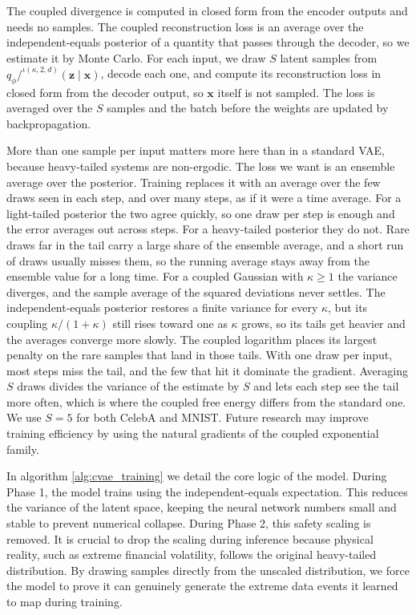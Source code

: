 \documentclass[twoside,11pt]{article}
\begin{document}
The coupled divergence is computed in closed form from the encoder outputs and needs no samples. The coupled reconstruction loss is an average over the independent-equals posterior of a quantity that passes through the decoder, so we estimate it by Monte Carlo. For each input, we draw $S$ latent samples from $q_\phi/^{\iota(\kappa,2,d)}(\mathbf{z}\mid\mathbf{x})$, decode each one, and compute its reconstruction loss in closed form from the decoder output, so $\mathbf{x}$ itself is not sampled. The loss is averaged over the $S$ samples and the batch before the weights are updated by backpropagation.

More than one sample per input matters more here than in a standard VAE, because heavy-tailed systems are non-ergodic. The loss we want is an ensemble average over the posterior. Training replaces it with an average over the few draws seen in each step, and over many steps, as if it were a time average. For a light-tailed posterior the two agree quickly, so one draw per step is enough and the error averages out across steps. For a heavy-tailed posterior they do not. Rare draws far in the tail carry a large share of the ensemble average, and a short run of draws usually misses them, so the running average stays away from the ensemble value for a long time. For a coupled Gaussian with $\kappa \geq 1$ the variance diverges, and the sample average of the squared deviations never settles. The independent-equals posterior restores a finite variance for every $\kappa$, but its coupling $\kappa/(1+\kappa)$ still rises toward one as $\kappa$ grows, so its tails get heavier and the averages converge more slowly. The coupled logarithm places its largest penalty on the rare samples that land in those tails. With one draw per input, most steps miss the tail, and the few that hit it dominate the gradient. Averaging $S$ draws divides the variance of the estimate by $S$ and lets each step see the tail more often, which is where the coupled free energy differs from the standard one. We use $S = 5$ for both CelebA and MNIST. Future research may improve training efficiency by using the natural gradients of the coupled exponential family.

In algorithm \ref{alg:cvae_training} we detail the core logic of the model. During Phase 1, the model trains using the independent-equals expectation. This reduces the variance of the latent space, keeping the neural network numbers small and stable to prevent numerical collapse. During Phase 2, this safety scaling is removed. It is crucial to drop the scaling during inference because physical reality, such as extreme financial volatility, follows the original heavy-tailed distribution. By drawing samples directly from the unscaled distribution, we force the model to prove it can genuinely generate the extreme data events it learned to map during training.
\end{document}
